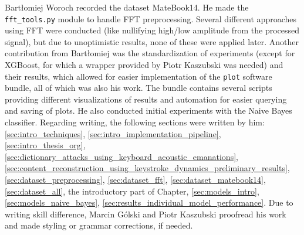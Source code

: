 \documentclass[../main.tex]{subfiles}
\begin{document}
Bartłomiej Woroch recorded the dataset MateBook14. He made the \verb|fft_tools.py| module to handle FFT preprocessing. Several different approaches using FFT were conducted (like nullifying high/low amplitude from the processed signal), but due to unoptimistic results, none of these were applied later. Another contribution from Bartłomiej was the standardization of experiments (except for XGBoost, for which a wrapper provided by Piotr Kaszubski was needed) and their results, which allowed for easier implementation of the \verb|plot| software bundle, all of which was also his work. The bundle contains several scripts providing different visualizations of results and automation for easier querying and saving of plots. He also conducted initial experiments with the Naive Bayes classifier. 
Regarding writing, the following sections were written by him: 
\ref{sec:intro_techniques},
\ref{sec:intro_implementation_pipeline},
\ref{sec:intro_thesis_org},
\ref{sec:dictionary_attacks_using_keyboard_acoustic_emanations},
\ref{sec:content_reconstruction_using_keystroke_dynamics_preliminary_results},
\ref{sec:dataset_preprocessing},
\ref{sec:dataset_fft},
\ref{sec:dataset_matebook14},
\ref{sec:dataset_all},
the introductory part of Chapter, \ref{sec:models_intro},
\ref{sec:models_naive_bayes},
\ref{sec:results_individual_model_performance}.
Due to writing skill difference, Marcin Gólski and Piotr Kaszubski proofread his work and made styling or grammar corrections, if needed.
\end{document}
